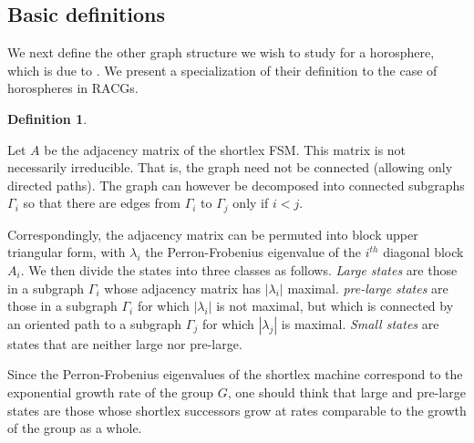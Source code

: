 \documentclass{amsart}
\theoremstyle{definition}
\newtheorem{definition}[theorem]{Definition}
\theoremstyle{remark}
\begin{document}
	\subsection{Basic definitions}
	\label{subsec:DivergenceDefinitions}
	We next define the other graph structure we wish to study for a horosphere, which is due to \cite{CGSR}. We present a specialization of their definition to the case of horospheres in RACGs.
	
	\begin{definition} \label{DivergenceGraphDef}
		
		Let $A$ be the adjacency matrix of the shortlex FSM. This matrix is not necessarily irreducible. That is, the graph need not be connected (allowing only directed paths). The graph can however be decomposed into connected subgraphs $\Gamma_i$ so that there are edges from $\Gamma_i$ to $\Gamma_j$ only if $i<j$. 
		
		Correspondingly, the adjacency matrix can be permuted into block upper triangular form, with $\lambda_i$ the Perron-Frobenius eigenvalue of the $i^{th}$ diagonal block $A_i$. We then divide the states into three classes as follows. \textit{Large states} are those in a subgraph $\Gamma_i$ whose adjacency matrix has $|\lambda_i|$ maximal. \textit{pre-large states} are those in a subgraph $\Gamma_i$ for which $|\lambda_i|$ is not maximal, but which is connected by an oriented path to a subgraph $\Gamma_j$ for which $|\lambda_j|$ is maximal. \textit{Small states} are states that are neither large nor pre-large.
		
	\end{definition}
	
	Since the Perron-Frobenius eigenvalues of the shortlex machine correspond to the exponential growth rate of the group $G$, one should think that large and pre-large states are those whose shortlex successors grow at rates comparable to the growth of the group as a whole.
	
\end{document}
